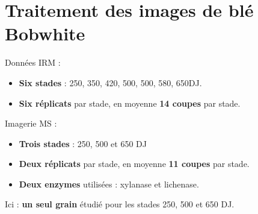 \documentclass[10pt]{beamer}
\begin{document}
\section{Traitement des images de blé Bobwhite}

\begin{frame}{Données}
  IRM :
  \begin{itemize}
  \item \textbf{Six stades} : 250, 350, 420, 500, 500, 580, 650DJ.
  \item \textbf{Six réplicats} par stade, en moyenne \textbf{14 coupes} par stade.
  \end{itemize}


  Imagerie MS :
  \begin{itemize}
  \item  \textbf{Trois stades} : 250, 500 et 650 DJ
  \item  \textbf{Deux réplicats} par stade, en moyenne \textbf{11 coupes} par stade.
  \item  \textbf{Deux enzymes} utilisées : xylanase et lichenase.
  \end{itemize}

Ici : \textbf{un seul grain} étudié pour les stades 250, 500 et 650 DJ.

\end{frame}
\end{document}
